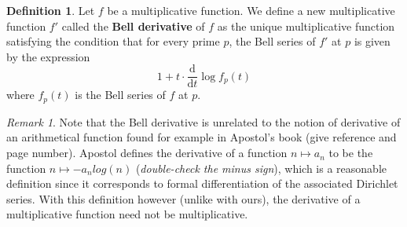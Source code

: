\documentclass[a4paper]{article}
\theoremstyle{definition}
\newtheorem{definition}{Definition}[section]
\theoremstyle{remark}
\newtheorem*{remark}{Remark}
\newcommand{\defhl}[1]{\textbf{#1}}
\begin{document}
\begin{definition}
Let $f$ be a multiplicative function. We define a new multiplicative function $f'$ called the \defhl{Bell derivative} of $f$ as the unique multiplicative function satisfying the condition that for every prime $p$, the Bell series of $f'$ at $p$ is given by the expression
$$   1 + t \cdot \frac{\mathrm{d}}{\mathrm{d}t} \log  f_p(t)      $$  
where $f_p(t)$ is the Bell series of $f$ at $p$. 
\end{definition}

\begin{remark}
Note that the Bell derivative is unrelated to the notion of derivative of an arithmetical function found for example in Apostol's book (give reference and page number). Apostol defines the derivative of a function $n \mapsto a_n$ to be the function $n \mapsto -a_n log(n)$ (\emph{double-check the minus sign}), which is a reasonable definition since it corresponds to formal differentiation of the associated Dirichlet series. With this definition however (unlike with ours), the derivative of a multiplicative function need not be multiplicative.





\end{remark}
\end{document}
